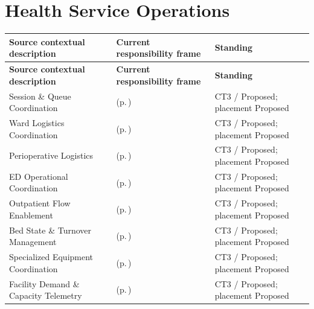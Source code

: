 \section{Health Service Operations}
\begingroup\small\setlength{\TableWidth}{\dimexpr\linewidth-6\tabcolsep-4\arrayrulewidth\relax}
\begin{longtable}{|>{\raggedright\arraybackslash}p{0.37\TableWidth}|>{\raggedright\arraybackslash}p{0.4\TableWidth}|>{\raggedright\arraybackslash}p{0.23\TableWidth}|}
\hline\rowcolor{TableHead}\textbf{Source contextual description} & \textbf{Current responsibility frame} & \textbf{Standing}\\\hline\endfirsthead
\hline\rowcolor{TableHead}\textbf{Source contextual description} & \textbf{Current responsibility frame} & \textbf{Standing}\\\hline\endhead
\hline\endfoot
Session \& Queue Coordination & \nameref{cap:bec-reviewed-session-queue-coordination} (p.\,\pageref{cap:bec-reviewed-session-queue-coordination}) & CT3 / Proposed; placement Proposed\\\hline
Ward Logistics Coordination & \nameref{cap:bec-reviewed-ward-logistics-coordination} (p.\,\pageref{cap:bec-reviewed-ward-logistics-coordination}) & CT3 / Proposed; placement Proposed\\\hline
Perioperative Logistics & \nameref{cap:bec-reviewed-perioperative-logistics-coordination} (p.\,\pageref{cap:bec-reviewed-perioperative-logistics-coordination}) & CT3 / Proposed; placement Proposed\\\hline
ED Operational Coordination & \nameref{cap:bec-reviewed-emergency-department-operational-coordination} (p.\,\pageref{cap:bec-reviewed-emergency-department-operational-coordination}) & CT3 / Proposed; placement Proposed\\\hline
Outpatient Flow Enablement & \nameref{cap:bec-reviewed-outpatient-flow-coordination} (p.\,\pageref{cap:bec-reviewed-outpatient-flow-coordination}) & CT3 / Proposed; placement Proposed\\\hline
Bed State \& Turnover Management & \nameref{cap:bec-reviewed-bed-care-place-state-administration} (p.\,\pageref{cap:bec-reviewed-bed-care-place-state-administration}) & CT3 / Proposed; placement Proposed\\\hline
Specialized Equipment Coordination & \nameref{cap:bec-reviewed-device-utilisation-administration} (p.\,\pageref{cap:bec-reviewed-device-utilisation-administration}) & CT3 / Proposed; placement Proposed\\\hline
Facility Demand \& Capacity Telemetry & \nameref{cap:bec-reviewed-service-demand-capacity-coordination} (p.\,\pageref{cap:bec-reviewed-service-demand-capacity-coordination}) & CT3 / Proposed; placement Proposed\\\hline

\end{longtable}
